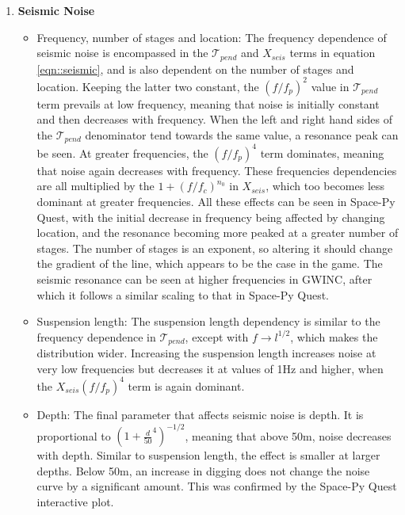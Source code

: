 \documentclass{article}
\begin{document}
\begin{enumerate}
    \item \textbf{Seismic Noise}
    \begin{itemize}
    \item Frequency, number of stages and location: The frequency dependence of seismic noise is encompassed in the $\mathcal{T}_{pend}$ and $X_{seis}$ terms in equation \ref{eqn::seismic}, and is also dependent on the number of stages and location. Keeping the latter two constant, the $(f/f_p)^2$ value in $\mathcal{T}_{pend}$ term prevails at low frequency, meaning that noise is initially constant and then decreases with frequency. When the left and right hand sides of the $\mathcal{T}_{pend}$ denominator tend towards the same value, a resonance peak can be seen. At greater frequencies, the $(f/f_p)^4$ term dominates, meaning that noise again decreases with frequency. These frequencies dependencies are all multiplied by the $1+(f/f_c)^{n_0}$ in $X_{seis}$, which too becomes less dominant at greater frequencies. All these effects can be seen in Space-Py Quest, with the initial decrease in frequency being affected by changing location, and the resonance becoming more peaked at a greater number of stages. The number of stages is an exponent, so altering it should change the gradient of the line, which appears to be the case in the game. The seismic resonance can be seen at higher frequencies in GWINC, after which it follows a similar scaling to that in Space-Py Quest. 
    \item Suspension length: The suspension length dependency is similar to the frequency dependence in $\mathcal{T}_{pend}$, except with $f\rightarrow l^{1/2}$, which makes the distribution wider. Increasing the suspension length increases noise at very low frequencies but decreases it at values of 1Hz and higher, when the $X_{seis}(f/f_p)^4$ term is again dominant. 
    \item Depth: The final parameter that affects seismic noise is depth. It is proportional to $(1+\frac{d}{50}^4)^{-1/2}$, meaning that above 50m, noise decreases with depth. Similar to suspension length, the effect is smaller at larger depths. Below 50m, an increase in digging does not change the noise curve by a significant amount. This was confirmed by the Space-Py Quest interactive plot.
    \end{itemize}
    

\end{enumerate}
\end{document}
